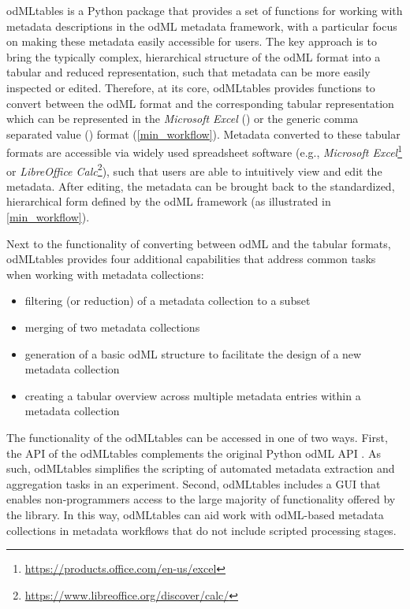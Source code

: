 odMLtables is a Python package that provides a set of functions for working with metadata descriptions in the odML metadata framework, with a particular focus on making these metadata easily accessible for users. The key approach is to bring the typically complex, hierarchical structure of the odML format into a tabular and reduced  representation, such that metadata can be more easily inspected or edited. Therefore, at its core, odMLtables provides functions to convert between the odML format and the corresponding tabular representation which can be represented in the \textit{Microsoft Excel} () or the generic comma separated value () format (\cref{min_workflow}). Metadata converted to these tabular formats are accessible via widely used spreadsheet software (e.g., \textit{Microsoft Excel}\footnote{\url{https://products.office.com/en-us/excel}} or \textit{LibreOffice Calc}\footnote{\url{https://www.libreoffice.org/discover/calc/}}), such that users are able to intuitively view and edit the metadata. After editing, the metadata can be brought back to the standardized, hierarchical form defined by the odML framework (as illustrated in \cref{min_workflow}).

Next to the functionality of converting between odML and the tabular formats, odMLtables provides four additional capabilities that address common tasks when working with metadata collections:
\begin{itemize}
    \item filtering (or reduction) of a metadata collection to a subset
    \item merging of two metadata collections
    \item generation of a basic odML structure to facilitate the design of a new metadata collection
    \item creating a tabular overview across multiple metadata entries within a metadata collection
\end{itemize}

The functionality of the odMLtables can be accessed in one of two ways. First, the API of the odMLtables complements the original Python odML API \citep{Grewe_2011}. As such, odMLtables simplifies the scripting of automated metadata extraction and aggregation tasks in an experiment. Second, odMLtables includes a GUI that enables non-programmers access to the large majority of functionality offered by the library. In this way, odMLtables can aid work with odML-based metadata collections in metadata workflows that do not include scripted processing stages.

